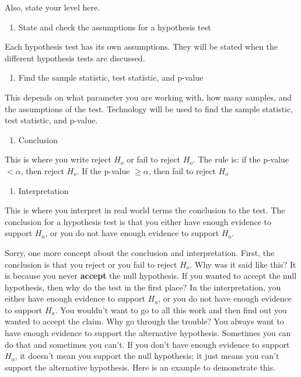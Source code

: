 \documentclass[
]{book}
\providecommand{\tightlist}{%
  \setlength{\itemsep}{0pt}\setlength{\parskip}{0pt}}
\begin{document}
Also, state your level here.

\begin{enumerate}
\def\labelenumi{\arabic{enumi}.}
\setcounter{enumi}{2}
\tightlist
\item
  State and check the assumptions for a hypothesis test
\end{enumerate}

Each hypothesis test has its own assumptions. They will be stated when the different hypothesis tests are discussed.

\begin{enumerate}
\def\labelenumi{\arabic{enumi}.}
\setcounter{enumi}{3}
\tightlist
\item
  Find the sample statistic, test statistic, and p-value
\end{enumerate}

This depends on what parameter you are working with, how many samples, and the assumptions of the test. Technology will be used to find the sample statistic, test statistic, and p-value.

\begin{enumerate}
\def\labelenumi{\arabic{enumi}.}
\setcounter{enumi}{4}
\tightlist
\item
  Conclusion
\end{enumerate}

This is where you write reject \(H_o\) or fail to reject \(H_o\). The rule is: if the p-value \(<\alpha\), then reject \(H_o\). If the p-value \(\ge\alpha\), then fail to reject \(H_o\)

\begin{enumerate}
\def\labelenumi{\arabic{enumi}.}
\setcounter{enumi}{5}
\tightlist
\item
  Interpretation
\end{enumerate}

This is where you interpret in real world terms the conclusion to the test. The conclusion for a hypothesis test is that you either have enough evidence to support \(H_a\), or you do not have enough evidence to support \(H_a\).

Sorry, one more concept about the conclusion and interpretation. First, the conclusion is that you reject or you fail to reject \(H_o\). Why was it said like this? It is because you never \textbf{accept} the null hypothesis. If you wanted to accept the null hypothesis, then why do the test in the first place? In the interpretation, you either have enough evidence to support \(H_a\), or you do not have enough evidence to support \(H_a\). You wouldn't want to go to all this work and then find out you wanted to accept the claim. Why go through the trouble? You always want to have enough evidence to support the alternative hypothesis. Sometimes you can do that and sometimes you can't. If you don't have enough evidence to support \(H_a\), it doesn't mean you support the null hypothesis; it just means you can't support the alternative hypothesis. Here is an example to demonstrate this.
\end{document}
